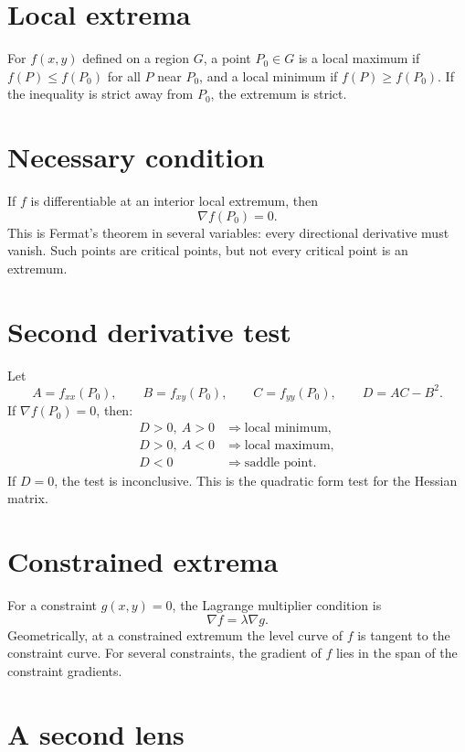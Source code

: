 

\section{Local extrema}

For $f(x,y)$ defined on a region $G$, a point $P_0\in G$ is a local maximum if $f(P)\le f(P_0)$ for all $P$ near $P_0$, and a local minimum if $f(P)\ge f(P_0)$.  If the inequality is strict away from $P_0$, the extremum is strict.

\section{Necessary condition}

If $f$ is differentiable at an interior local extremum, then
\[
  \nabla f(P_0)=0.
\]
This is Fermat's theorem in several variables: every directional derivative must vanish.  Such points are critical points, but not every critical point is an extremum.

\section{Second derivative test}

Let
\[
  A=f_{xx}(P_0),\qquad B=f_{xy}(P_0),\qquad C=f_{yy}(P_0),\qquad D=AC-B^2.
\]
If $\nabla f(P_0)=0$, then:
\[
\begin{aligned}
  D>0,\ A>0&\Rightarrow\text{local minimum},\\
  D>0,\ A<0&\Rightarrow\text{local maximum},\\
  D<0&\Rightarrow\text{saddle point}.
\end{aligned}
\]
If $D=0$, the test is inconclusive.  This is the quadratic form test for the Hessian matrix.

\section{Constrained extrema}

For a constraint $g(x,y)=0$, the Lagrange multiplier condition is
\[
  \nabla f=\lambda \nabla g.
\]
Geometrically, at a constrained extremum the level curve of $f$ is tangent to the constraint curve.  For several constraints, the gradient of $f$ lies in the span of the constraint gradients.

\section{A second lens}

